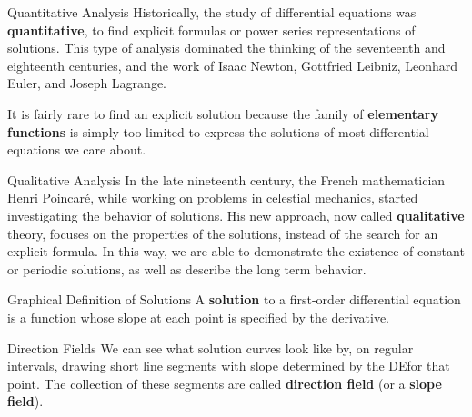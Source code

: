 \documentclass{beamer}
\begin{document}
\begin{frame}
\begin{block}{Quantitative Analysis}
Historically, the study of differential equations was \textbf{quantitative}, to find explicit formulas or power series representations of solutions. This type of analysis dominated the thinking of the seventeenth and eighteenth centuries, and the work of Isaac Newton, Gottfried Leibniz, Leonhard Euler, and Joseph Lagrange.\pause

\vspace{2mm}
It is fairly rare to find an explicit solution because the family of \textbf{elementary functions} is simply too limited to express the solutions of most differential equations we care about.
\end{block}\pause

\begin{block}{Qualitative Analysis}
In the late nineteenth century, the French mathematician Henri Poincar\'{e}, while working on problems in celestial mechanics, started investigating the behavior of solutions. His new approach, now called \textbf{qualitative} theory, focuses on the properties of the solutions, instead of the search for an explicit formula. In this way, we are able to demonstrate the existence of constant or periodic solutions, as well as describe the long term behavior.
\end{block}
\end{frame}

\begin{frame}
\begin{block}{Graphical Definition of Solutions}
A \textbf{solution} to a first-order differential equation is a function whose slope at each point is specified by the derivative.
\end{block}

\begin{block}{Direction Fields}
We can see what solution curves look like by, on regular intervals, drawing short line segments with slope determined by the DE\@ for that point. The collection of these segments are called \textbf{direction field} (or a \textbf{slope field}).
\end{block}
\end{frame}
\end{document}

